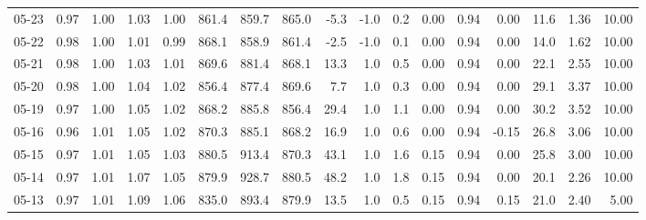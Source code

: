 \begin{threeparttable}
{\begin{tabular}{lrrrrrrrrrrrrrrrr}
  05-23 &         0.97 &           1.00 &          1.03 &          1.00 & 861.4 & 859.7 & 865.0 &       -5.3 &                     -1.0 &                 0.2 &       0.00 &      0.94 &           0.00 &             11.6 &            1.36 &                  10.00 \\
  05-22 &         0.98 &           1.00 &          1.01 &          0.99 & 868.1 & 858.9 & 861.4 &       -2.5 &                     -1.0 &                 0.1 &       0.00 &      0.94 &           0.00 &             14.0 &            1.62 &                  10.00 \\
  05-21 &         0.98 &           1.00 &          1.03 &          1.01 & 869.6 & 881.4 & 868.1 &       13.3 &                      1.0 &                 0.5 &       0.00 &      0.94 &           0.00 &             22.1 &            2.55 &                  10.00 \\
  05-20 &         0.98 &           1.00 &          1.04 &          1.02 & 856.4 & 877.4 & 869.6 &        7.7 &                      1.0 &                 0.3 &       0.00 &      0.94 &           0.00 &             29.1 &            3.37 &                  10.00 \\
  05-19 &         0.97 &           1.00 &          1.05 &          1.02 & 868.2 & 885.8 & 856.4 &       29.4 &                      1.0 &                 1.1 &       0.00 &      0.94 &           0.00 &             30.2 &            3.52 &                  10.00 \\
  05-16 &         0.96 &           1.01 &          1.05 &          1.02 & 870.3 & 885.1 & 868.2 &       16.9 &                      1.0 &                 0.6 &       0.00 &      0.94 &          -0.15 &             26.8 &            3.06 &                  10.00 \\
  05-15 &         0.97 &           1.01 &          1.05 &          1.03 & 880.5 & 913.4 & 870.3 &       43.1 &                      1.0 &                 1.6 &       0.15 &      0.94 &           0.00 &             25.8 &            3.00 &                  10.00 \\
  05-14 &         0.97 &           1.01 &          1.07 &          1.05 & 879.9 & 928.7 & 880.5 &       48.2 &                      1.0 &                 1.8 &       0.15 &      0.94 &           0.00 &             20.1 &            2.26 &                  10.00 \\
  05-13 &         0.97 &           1.01 &          1.09 &          1.06 & 835.0 & 893.4 & 879.9 &       13.5 &                      1.0 &                 0.5 &       0.15 &      0.94 &           0.15 &             21.0 &            2.40 &                   5.00 \\

\end{tabular}}
\end{threeparttable}
